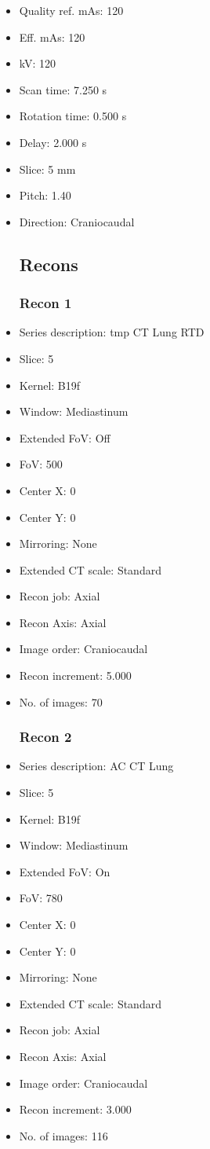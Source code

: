 \documentclass[12pt]{article}
\begin{document}
\begin{itemize}
\subsection{Scan}
\item Quality ref. mAs: 120\item Eff. mAs: 120\item kV: 120\item Scan time: 7.250 s\item Rotation time: 0.500 s\item Delay: 2.000 s\item Slice: 5 mm\item Pitch: 1.40\item Direction: Craniocaudal\subsection{Recons}

\subsubsection{Recon 1}
\item Series description: tmp CT Lung RTD
\item Slice: 5
\item Kernel: B19f
\item Window: Mediastinum
\item Extended FoV: Off
\item FoV: 500
\item Center X: 0
\item Center Y: 0
\item Mirroring: None
\item Extended CT scale: Standard
\item Recon job: Axial
\item Recon Axis: Axial
\item Image order: Craniocaudal
\item Recon increment: 5.000
\item No. of images: 70
\subsubsection{Recon 2}
\item Series description: AC CT Lung
\item Slice: 5
\item Kernel: B19f
\item Window: Mediastinum
\item Extended FoV: On
\item FoV: 780
\item Center X: 0
\item Center Y: 0
\item Mirroring: None
\item Extended CT scale: Standard
\item Recon job: Axial
\item Recon Axis: Axial
\item Image order: Craniocaudal
\item Recon increment: 3.000
\item No. of images: 116

\end{itemize}
\end{document}
